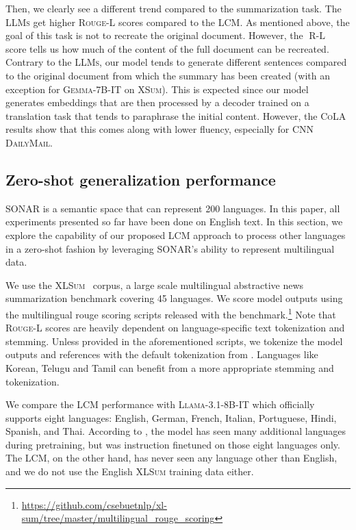 \documentclass[twoside,11pt]{fairmeta}
\newcommand{\llms}{\textsc{LLMs}\xspace}
\newcommand{\gemmaIT}{\textsc{Gemma-7B-IT}\xspace}
\newcommand{\llamaIT}{\textsc{Llama-3.1-8B-IT}\xspace}
\newcommand{\sonar}{\textsc{SONAR}\xspace}
\newcommand{\lcm}{\textsc{LCM}\xspace}
\DeclareMathOperator{\rougel}{R-L}
\newcommand{\cnndm}{\textsc{CNN DailyMail}\xspace}
\newcommand{\xsum}{\textsc{XSum}\xspace}
\newcommand{\xlsum}{\textsc{XLSum}\xspace}
\newcommand{\rougellong}{\textsc{Rouge-L}\xspace}
\newcommand{\cola}{\textsc{CoLA}\xspace}
\begin{document}
Then, we clearly see a different trend compared to the summarization task. 
The \llms get higher \rougellong scores compared to the \lcm. 
As mentioned above, the goal of this task is not to recreate the original document. However, the $\rougel$ score tells us how much of the content of the full document can be recreated.
Contrary to the \llms, our model tends to generate different sentences compared to the original document from which the summary has been created (with an exception for \gemmaIT on \xsum). 
This is expected since our model generates embeddings that are then processed by a decoder trained on a translation task that tends to paraphrase the initial content.
However, the \cola results show that this comes along with lower fluency, especially for \cnndm.




\subsection{Zero-shot generalization performance}




\sonar is a semantic space that can represent 200 languages.
In this paper, all experiments presented so far have been done on English text.
In this section, we explore the capability of our proposed \lcm approach to process other languages in a zero-shot fashion by leveraging \sonar's ability to represent multilingual data.

We use  the \xlsum~\citep{hasan-etal-2021-xl} corpus, a large scale multilingual abstractive news summarization benchmark covering 45 languages. We score model outputs using the multilingual rouge scoring scripts released with the benchmark.\footnote{\url{https://github.com/csebuetnlp/xl-sum/tree/master/multilingual_rouge_scoring}} Note that \rougellong scores are heavily dependent on language-specific text tokenization and stemming. Unless provided in the aforementioned scripts, we tokenize the model outputs and references with the default tokenization from \citet{lin2004rouge}. Languages like Korean, Telugu and Tamil can benefit from a more appropriate stemming and tokenization.

We compare the LCM performance with \llamaIT which officially supports eight languages: English, German, French, Italian, Portuguese, Hindi, Spanish, and Thai. According to \citet{llama3.arxiv.2024}, the model has seen many additional languages during pretraining, but was instruction finetuned on those eight languages only. The \lcm, on the other hand, has never seen any language other than English, and we do not use the English \xlsum training data either.
\end{document}
